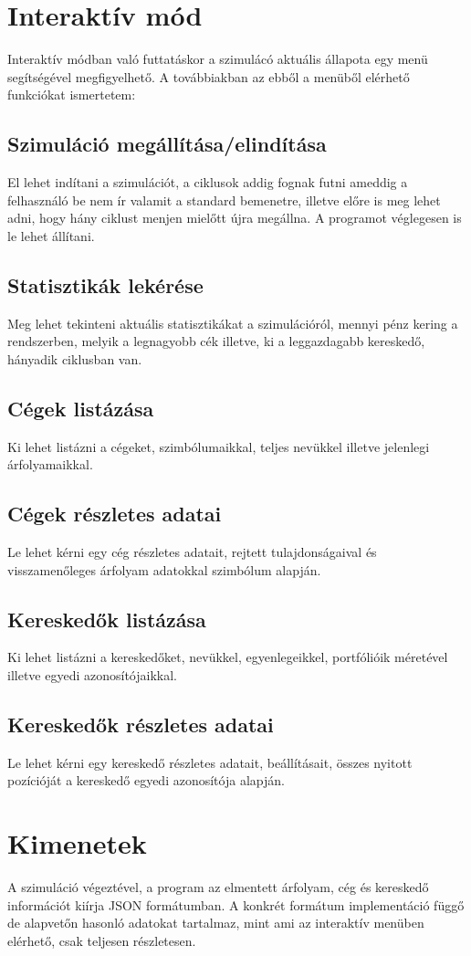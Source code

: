 \documentclass{article}[12pt,a4paper]
\begin{document}
    \section{Interaktív mód}
    Interaktív módban való futtatáskor a szimulácó aktuális állapota egy menü segítségével megfigyelhető.
    A továbbiakban az ebből a menüből elérhető funkciókat ismertetem:

    \subsection{Szimuláció megállítása/elindítása}
    El lehet indítani a szimulációt, a ciklusok addig fognak futni ameddig a felhasználó be nem ír valamit a standard bemenetre, illetve előre is meg lehet adni, hogy hány ciklust menjen mielőtt újra megállna.
    A programot véglegesen is le lehet állítani.

    \subsection{Statisztikák lekérése}
    Meg lehet tekinteni aktuális statisztikákat a szimulációról, mennyi pénz kering a rendszerben, melyik a legnagyobb cék illetve, ki a leggazdagabb kereskedő, hányadik ciklusban van.

    \subsection{Cégek listázása}
    Ki lehet listázni a cégeket, szimbólumaikkal, teljes nevükkel illetve jelenlegi árfolyamaikkal.

    \subsection{Cégek részletes adatai}
    Le lehet kérni egy cég részletes adatait, rejtett tulajdonságaival és visszamenőleges árfolyam adatokkal szimbólum alapján.

    \subsection{Kereskedők listázása}
    Ki lehet listázni a kereskedőket, nevükkel, egyenlegeikkel, portfólióik méretével illetve egyedi azonosítójaikkal.

    \subsection{Kereskedők részletes adatai}
    Le lehet kérni egy kereskedő részletes adatait, beállításait, összes nyitott pozícióját a kereskedő egyedi azonosítója alapján.

    \section{Kimenetek}
    A szimuláció végeztével, a program az elmentett árfolyam, cég és kereskedő információt kiírja JSON formátumban.
    A konkrét formátum implementáció függő de alapvetőn hasonló adatokat tartalmaz, mint ami az interaktív menüben elérhető, csak teljesen részletesen.
\end{document}
